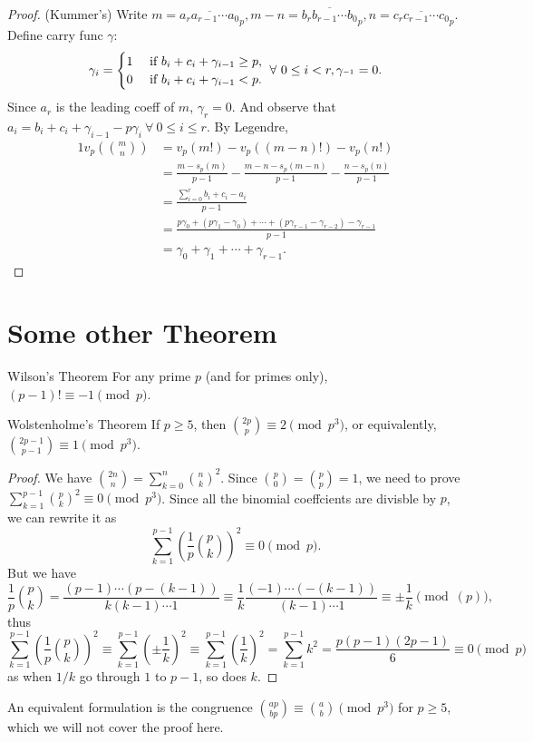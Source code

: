 \begin{proof}(Kummer's)
    Write $m=\overline{a_ra_{r-1}\cdots a_0}_p, m-n=\overline{b_rb_{r-1}\cdots b_0}_p, n=\overline{c_rc_{r-1}\cdots c_0}_p$. Define carry func $\gamma$: 
    \[\gamma_i=
        \begin{cases}
            1&\textnormal{ if }b_i+c_i+\gamma _{i-1}\geq p,\\
            0&\textnormal{ if }b_i+c_i+\gamma _{i-1}<p.
        \end{cases}\ \forall\ 0\leq i<r, \gamma _{^{-1}}=0.
    \]
    Since $a_r$ is the leading coeff of $m$, $\gamma _r=0$. And observe that $a_i=b_i+c_i+\gamma _{i-1}-p\gamma _i\ \forall\ 0\leq i\leq r$. By Legendre, 
    \begin{alignat*}{1}
        v_p\left({m\choose n}\right)
            &= v_p(m!)-v_p((m-n)!)-v_p(n!)\\
            &= \frac{m-s_p(m)}{p-1}-\frac{m-n-s_p(m-n)}{p-1}-\frac{n-s_p(n)}{p-1}\\
            &= \frac{\sum_{i=0}^{r}b_i+c_i-a_i}{p-1}\\
            &= \frac{p\gamma _0+(p\gamma _1-\gamma _0)+\cdots +(p\gamma _{r-1}-\gamma _{r-2})-\gamma _{r-1}}{p-1}\\
            &= \gamma _0+\gamma _1+\cdots +\gamma _{r-1}.
    \end{alignat*}
\end{proof}

\newpage
\section{Some other Theorem}

\begin{theorem}[thm:]{Wilson's Theorem}
    For any prime $p$ (and for primes only), $(p-1)!\equiv -1\pmod{p}$.
\end{theorem}

\begin{theorem}[thm:]{Wolstenholme's Theorem}
    If $p\geq 5$, then ${2p\choose p}\equiv 2\pmod{p^3}$, or equivalently, ${2p-1\choose p-1}\equiv 1\pmod{p^3}$.
    \begin{proof}
        We have ${2n\choose n}=\sum_{k=0}^{n}{n\choose k}^2$. Since ${p\choose 0}={p\choose p}=1$, we need to prove $\sum_{k=1}^{p-1}{p\choose k}^2\equiv 0\pmod{p^3}$. Since all the binomial coeffcients are divisble by $p$, we can rewrite it as
        \[\sum_{k=1}^{p-1}\left(\frac{1}{p}{p\choose k}\right)^2\equiv 0\pmod{p}.\]
        But we have
        \[\frac{1}{p}{p\choose k}=\frac{(p-1)\cdots (p-(k-1))}{k(k-1)\cdots 1}\equiv \frac{1}{k}\frac{(-1)\cdots (-(k-1))}{(k-1)\cdots 1}\equiv \pm\frac{1}{k}\pmod(p),\]
        thus
        \[\sum_{k=1}^{p-1}\left(\frac{1}{p}{p\choose k}\right)^2\equiv \sum_{k=1}^{p-1}\left(\pm\frac{1}{k}\right)^2\equiv \sum_{k=1}^{p-1}\left(\frac{1}{k}\right)^2=\sum_{k=1}^{p-1}k^2=\frac{p(p-1)(2p-1)}{6}\equiv 0\pmod{p}\]
        as when $1/k$ go through $1$ to $p-1$, so does $k$.
    \end{proof}
\end{theorem}

\begin{remark}
    An equivalent formulation is the congruence ${ap\choose bp}\equiv {a\choose b}\pmod{p^3}$ for $p\geq 5$, which we will not cover the proof here.
\end{remark}
